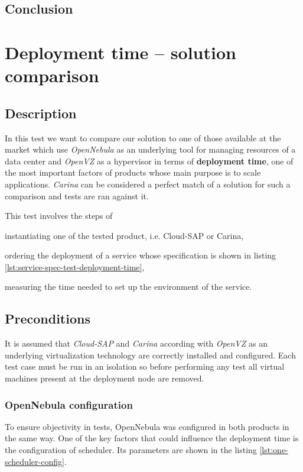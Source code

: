 \subsection*{Conclusion}

\section{Deployment time -- solution comparison}
\subsection*{Description}
In this test we want to compare our solution to one of those available at the market which use \emph{OpenNebula} as an underlying tool for managing resources of a data center and \emph{OpenVZ} as a hypervisor in terms of \textbf{deployment time}, one of the most important factors of products whose main purpose is to scale applications.
\emph{Carina} \cite{Carina} can be considered a perfect match of a solution for such a comparison and tests are ran against it.

This test involves the steps of
  \begin{inparaenum}[i)]
    \item instantiating one of the tested product, i.e. Cloud-SAP or Carina,
    \item ordering the deployment of a service whose specification is shown in listing \ref{lst:service-spec-test-deployment-time},
    \item measuring the time needed to set up the environment of the service.
  \end{inparaenum}

\subsection*{Preconditions}
It is assumed that \emph{Cloud-SAP} and \emph{Carina} according with \emph{OpenVZ} as an underlying virtualization technology are correctly installed and configured.
Each test case must be run in an isolation so before performing any test all virtual machines present at the deployment node are removed.
\subsubsection{OpenNebula configuration}
To ensure objectivity in tests, OpenNebula was configured in both products in the same way. One of the key factors that could influence the deployment time is the configuration of scheduler. Its parameters are shown in the listing \ref{lst:one-scheduler-config}.

